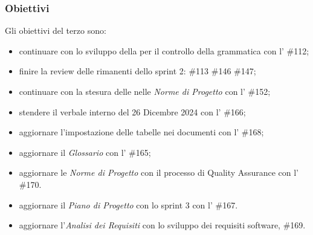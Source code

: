 \subsubsection{Obiettivi}
Gli obiettivi del terzo  sono:
\begin{itemize}
    \item continuare con lo sviluppo della  per il controllo della grammatica con l' \#112;
    \item finire la review delle  rimanenti dello sprint 2: \#113 \#146 \#147;
    \item continuare con la stesura delle  nelle \textit{Norme di Progetto} con l' \#152;
    \item stendere il verbale interno del 26 Dicembre 2024 con l' \#166;
    \item aggiornare l'impostazione delle tabelle nei documenti con l' \#168;
    \item aggiornare il \textit{Glossario} con l' \#165;
    \item aggiornare le \textit{Norme di Progetto} con il processo di Quality Assurance con l' \#170.
    \item aggiornare il \textit{Piano di Progetto} con lo sprint 3 con l' \#167.
    \item aggiornare l'\textit{Analisi dei Requisiti} con lo sviluppo dei requisiti software,  \#169.
\end{itemize}